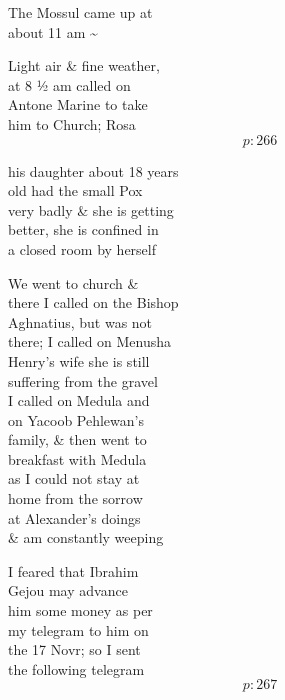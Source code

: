 \documentclass{report}
\begin{document}
	\par{
 	The Mossul came up at\ \\about 11 am \~{}\ \\
	}

	\par{
 	Light air \& fine weather,\ \\at 8 ½ am called on\ \\Antone Marine to take\ \\him to Church; Rosa\ \\
  \[p: 266 \]

	}


	\par{
 	his daughter about 18 years\ \\old had the small Pox\ \\very badly \& she is getting\ \\better, she is confined in\ \\a closed room by herself\ \\
	}

	\par{
 	We went to church \&\ \\there I called on the Bishop\ \\Aghnatius, but was not\ \\there; I called on Menusha\ \\Henry’s wife she is still\ \\suffering from the gravel\ \\I called on Medula and\ \\on Yacoob Pehlewan’s\ \\family, \& then went to\ \\breakfast with Medula\ \\as I could not stay at\ \\home from the sorrow\ \\at Alexander’s doings\ \\\& am constantly weeping\ \\
	}

	\par{
 	I feared that Ibrahim\ \\Gejou may advance\ \\him some money as per\ \\my telegram to him on\ \\the 17 Novr; so I sent\ \\the following telegram\ \\
  \[p: 267 \]

	}
\end{document}
